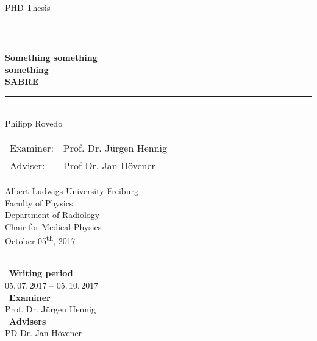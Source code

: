 
\begin{titlepage}
\begin{center}

\newcommand{\HorizontalLine}{\rule{\linewidth}{0.3mm}}

{\Large PHD Thesis}\\[1.3cm]


\HorizontalLine \\[0.4cm]
\begin{spacing}{3}
    {\huge \bfseries  Something something } \\
    {\huge \bfseries something} \\
    {\huge \bfseries SABRE}\\
\end{spacing}
\HorizontalLine \\[1.5cm]


	{\Huge Philipp Rovedo} \\[2cm]


\begin{tabular}[hc]{>{\huge}l >{\huge}l}
  Examiner: & Prof. Dr. J\"urgen Hennig \\[0.3cm]
  Adviser: & Prof Dr. Jan H\"ovener \\[1.2cm]
\end{tabular}
\vfill  %

\Large {
    Albert-Ludwigs-University Freiburg\\
    Faculty of Physics\\
    Department of Radiology\\
    Chair for Medical Physics\\[1cm]

    October 05\textsuperscript{th}, 2017\\
}
\end{center}
\end{titlepage}

\ \vfill \ \\  %
\
\textbf{Writing period}            \smallskip{} \\
05.\,07.\,2017 -- 05.\,10.\,2017   \bigskip{} \\
\
\textbf{Examiner}                  \smallskip{} \\
Prof. Dr. J\"urgen Hennig               \bigskip{} \\
\
\textbf{Advisers}                  \smallskip{} \\
PD Dr. Jan H\"ovener
